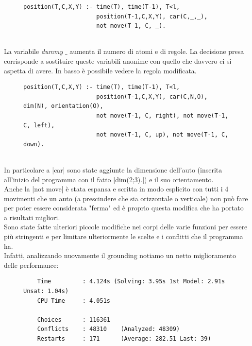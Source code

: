 \documentclass[10pt, a4paper, oneside]{article}
\begin{document}
\begin{figure}[H]
\centering
\begin{verbatim}
position(T,C,X,Y) :- time(T), time(T-1), T<l, 
                     position(T-1,C,X,Y), car(C,_,_), 
                     not move(T-1, C, _).
\end{verbatim}
\end{figure}

\noindent
\\La variabile \emph{dummy} $\_$ aumenta il numero di atomi e di regole. La decisione presa corrisponde a sostituire queste variabili anonime con quello che davvero ci si aspetta di avere. In basso è possibile vedere la regola modificata.

\begin{figure}[H]
\centering
\begin{verbatim}
position(T,C,X,Y) :- time(T), time(T-1), T<l, 
                     position(T-1,C,X,Y), car(C,N,O), dim(N), orientation(O), 
                     not move(T-1, C, right), not move(T-1, C, left), 
                     not move(T-1, C, up), not move(T-1, C, down).
\end{verbatim}
\label{code:new_position_v2}
\end{figure}

\noindent
\\In particolare a |car| sono state aggiunte la dimensione dell'auto (inserita all'inizio del programma con il fatto |dim(2;3).|) e il suo orientamento. \\
Anche la |not move| è stata espansa e scritta in modo esplicito con tutti i 4 movimenti che un auto (a prescindere che sia orizzontale o verticale) non può fare per poter essere considerata "ferma" ed è proprio questa modifica che ha portato a risultati migliori. \\

\noindent
Sono state fatte ulteriori piccole modifiche nei corpi delle varie funzioni per essere più stringenti e per limitare ulteriormente le scelte e i conflitti che il programma ha. \\

\noindent
Infatti, analizzando nuovamente il grounding notiamo un netto miglioramento delle performance:
\begin{figure}[H]
\centering
\begin{verbatim}
    Time         : 4.124s (Solving: 3.95s 1st Model: 2.91s Unsat: 1.04s)
    CPU Time     : 4.051s

    Choices      : 116361  
    Conflicts    : 48310    (Analyzed: 48309)
    Restarts     : 171      (Average: 282.51 Last: 39)
\end{verbatim}
\end{figure}
\end{document}

